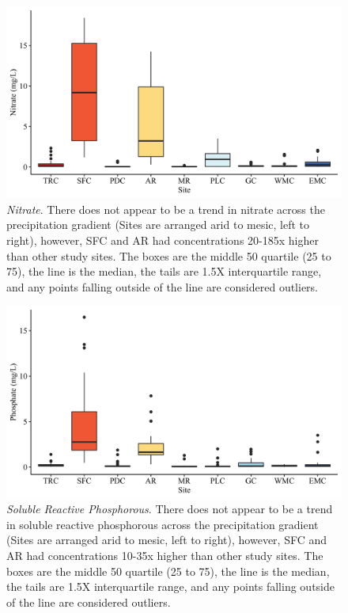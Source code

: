 \begin{figure}[htb]
\begin{center}
\includegraphics[scale=0.2]{Figs/NitrBox.png}
\caption[Nitrate]{\textit{Nitrate}. There does not appear to be a trend in nitrate across the precipitation gradient (Sites are arranged arid to mesic, left to right), however, SFC and AR had concentrations 20-185x higher than other study sites. The boxes are the middle 50 quartile (25 to 75), the line is the median, the tails are 1.5X interquartile range, and any points falling outside of the line are considered outliers.}
\label{Fig:Nitrate}
\end{center}
\end{figure}

\begin{figure}[htb]
\begin{center}
\includegraphics[scale=0.2]{Figs/OrthoPBox.png}
\caption[Soluble Reactive Phosphorous]{\textit{Soluble Reactive Phosphorous}. There does not appear to be a trend in soluble reactive phosphorous across the precipitation gradient (Sites are arranged arid to mesic, left to right), however, SFC and AR had concentrations 10-35x higher than other study sites. The boxes are the middle 50 quartile (25 to 75), the line is the median, the tails are 1.5X interquartile range, and any points falling outside of the line are considered outliers.}
\label{Fig:SPR}
\end{center}
\end{figure}

